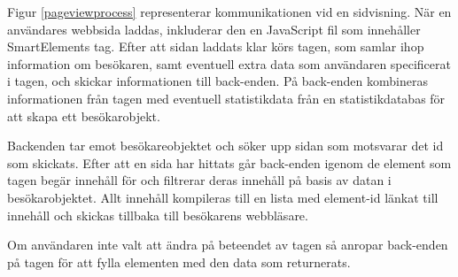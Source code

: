 Figur \ref{pageviewprocess} representerar kommunikationen vid en sidvisning. När en användares webbsida laddas, inkluderar den en JavaScript fil som innehåller SmartElements tag. Efter att sidan laddats klar körs tagen, som samlar ihop information om besökaren, samt eventuell extra data som användaren specificerat i tagen, och skickar informationen till back-enden. På back-enden kombineras informationen från tagen med eventuell statistikdata från en statistikdatabas för att skapa ett besökarobjekt.

Backenden tar emot besökareobjektet och söker upp sidan som motsvarar det id som skickats. Efter att en sida har hittats går back-enden igenom de element som tagen begär innehåll för och filtrerar deras innehåll på basis av datan i besökarobjektet. Allt innehåll kompileras till en lista med element-id länkat till innehåll och skickas tillbaka till besökarens webbläsare.

Om användaren inte valt att ändra på beteendet av tagen så anropar back-enden på tagen för att fylla elementen med den data som returnerats.
